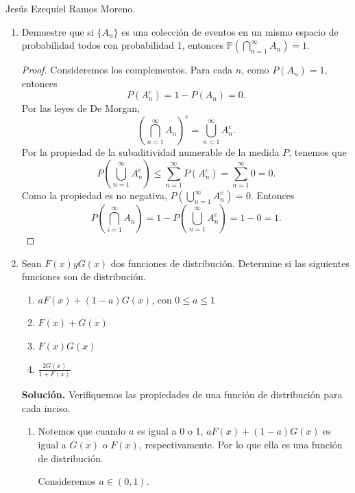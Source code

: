 \documentclass{article}
\newcommand{\ntarea}{1}
\begin{document}
\pagestyle{fancy}
\rhead{Tarea \ntarea}

\large{Jesús Ezequiel Ramos Moreno.}
\begin{enumerate}
    \item[2.] Demuestre que si \(\{A_n\}\) es una colección de eventos en un mismo espacio de probabilidad todos con probabilidad 1, entonces \(\mathbb{P}(\bigcap_{n=1}^{\infty} A_n) = 1\).
    \begin{proof}
        Consideremos los complementos. Para cada \(n\), como \(P(A_n) = 1\), entonces
        \[
        P(A_n^c) = 1 - P(A_n) = 0.
        \]
        Por las leyes de De Morgan,
        \[
        {\left(\bigcap_{n = 1}^\infty A_n\right)}^c = \bigcup_{n = 1}^\infty A_n ^c.
        \]
        Por la propiedad de la subaditividad numerable de la medida \(P\), tenemos que
        \[
        P\left(\bigcup_{n = 1} ^\infty A_n ^c\right) \leq \sum_{n = 1}^{\infty}P(A_n^c) = \sum_{n=1}^{\infty}0 = 0.
        \]
        Como la propiedad es no negativa, \(P\left(\bigcup_{n = 1} ^\infty A_n ^c\right) = 0\). Entonces 
        \[
        P\left(\bigcap_{i = 1}^\infty A_n\right) = 1 - P\left(\bigcup_{n = 1} ^\infty A_n ^c\right) = 1 - 0 = 1.
        \]
    \end{proof}
    \item[4.] Sean \(F(x) y G(x)\) dos funciones de distribución. Determine si las siguientes funciones son de distribución.
    \begin{enumerate}[label={(\roman*)}]
        \item \(aF(x) + (1 - a)G(x)\), con \(0 \leq a \leq 1\)
        \item \(F(x) + G(x)\)
        \item \(F(x)G(x)\)
        \item \(\frac{2G(x)}{1 + F(x)}\)
    \end{enumerate}
    \textbf{Solución.} Verifiquemos las propiedades de una función de distribución para cada inciso.
    \begin{enumerate}[label={(\roman*)}]
        \item Notemos que cuando \(a\) es igual a 0 o 1, \(aF(x) + (1 - a)G(x)\) es igual a \(G(x)\) o \(F(x)\), respectivamente. Por lo que ella es una función de distribución.
        
        Consideremos \(a \in (0, 1)\).
    \end{enumerate}
\end{enumerate}
\end{document}
